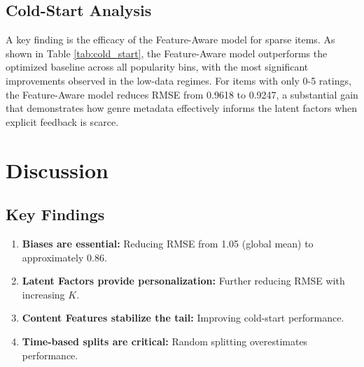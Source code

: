 \documentclass{article}
\theoremstyle{plain}
\theoremstyle{definition}
\theoremstyle{remark}
\begin{document}
\subsection{Cold-Start Analysis}
A key finding is the efficacy of the Feature-Aware model for sparse items. As shown in Table \ref{tab:cold_start}, the Feature-Aware model outperforms the optimized baseline across all popularity bins, with the most significant improvements observed in the low-data regimes. For items with only 0-5 ratings, the Feature-Aware model reduces RMSE from 0.9618 to 0.9247, a substantial gain that demonstrates how genre metadata effectively informs the latent factors when explicit feedback is scarce.

\begin{table}[!ht]
\caption{Cold-Start Performance: RMSE by Item Popularity}
\centering
\setlength{\tabcolsep}{4pt} %
\renewcommand{\arraystretch}{1.1} %
\label{tab:cold_start}
\end{table}


\section{Discussion} %

\subsection{Key Findings}
\begin{enumerate}
    \item \textbf{Biases are essential:} Reducing RMSE from 1.05 (global mean) to approximately 0.86.
    \item \textbf{Latent Factors provide personalization:} Further reducing RMSE with increasing $K$.
    \item \textbf{Content Features stabilize the tail:} Improving cold-start performance.
    \item \textbf{Time-based splits are critical:} Random splitting overestimates performance.
\end{enumerate}
\end{document}

